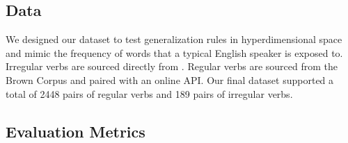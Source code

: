 \documentclass{article}
\begin{document}
\subsection{Data}
We designed our dataset to test generalization rules in hyperdimensional space and mimic the frequency of words that a typical English speaker is exposed to. Irregular verbs are sourced directly from \citet{Rumelhart1986a}. Regular verbs are sourced from the Brown Corpus and paired with an online API. Our final dataset supported a total of 2448 pairs of regular verbs and 189 pairs of irregular verbs. 
    
\subsection{Evaluation Metrics}


\end{document}
